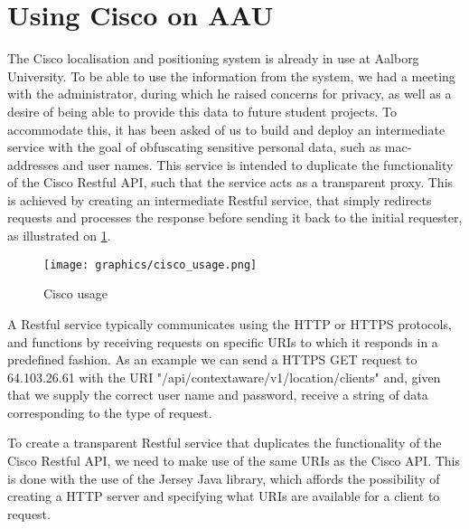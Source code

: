 \section{Using Cisco on AAU}
The Cisco localisation and positioning system is already in use at Aalborg University. To be able to use the information from the system, we had a meeting with the administrator, during which he raised concerns for privacy, as well as a desire of being able to provide this data to future student projects. To accommodate this, it has been asked of us to build and deploy an intermediate service with the goal of obfuscating sensitive personal data, such as mac-addresses and user names. This service is intended to duplicate the functionality of the Cisco Restful API, such that the service acts as a transparent proxy. This is achieved by creating an intermediate Restful service, that simply redirects requests and processes the response before sending it back to the initial requester, as illustrated on \cref{fig:cisco_usage}.

\begin{figure}[h]
	\begin{center}
	\texttt{[image: graphics/cisco\_usage.png]}
	\caption{Cisco usage}
	\label{fig:cisco_usage}
	\end{center} 
\end{figure}

A Restful service typically communicates using the HTTP or HTTPS protocols, and functions by receiving requests on specific URIs to which it responds in a predefined fashion. As an example we can send a HTTPS GET request to 64.103.26.61 with the URI "/api/contextaware/v1/location/clients" and, given that we supply the correct user name and password, receive a string of data corresponding to the type of request.  

To create a transparent Restful service that duplicates the functionality of the Cisco Restful API, we need to make use of the same URIs as the Cisco API. This is done with the use of the Jersey Java library, which affords the possibility of creating a HTTP server and specifying what URIs are available for a client to request.

